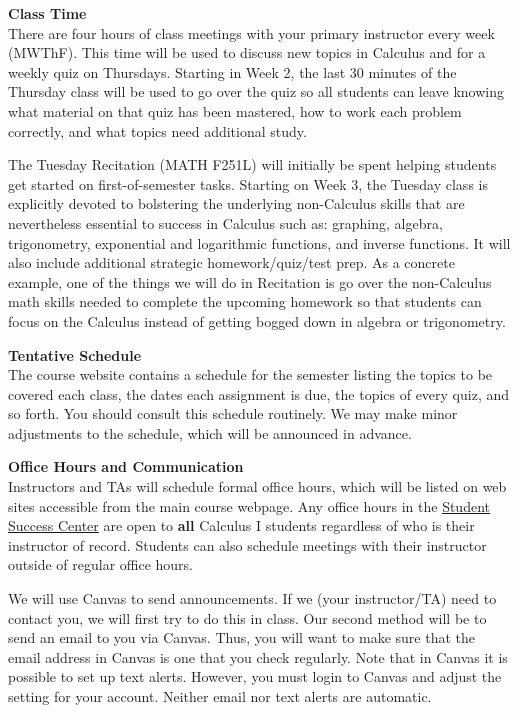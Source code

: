 \documentclass[12pt]{article}
\renewcommand{\emph}[1]{\textsf{\textbf{#1}}}
\newcommand{\localhead}[1]{\par\smallskip\textbf{#1}\nobreak\\}%
\def\heading#1{\localhead{\large\emph{#1}}}
\begin{document}
\newpage

\heading{Class Time}
There are four hours of class meetings with your primary instructor every week (MWThF). This time will be used to discuss new topics in Calculus and for a weekly quiz on Thursdays. Starting in Week 2, the last 30 minutes of the Thursday class will be used to go over the quiz so all students can leave knowing what material on that quiz has been mastered, how to work each problem correctly,  and what topics need additional study. 

The Tuesday Recitation (MATH F251L) will initially be spent helping students get started on first-of-semester tasks. Starting on Week 3, the Tuesday class is explicitly devoted to bolstering the underlying non-Calculus skills that are nevertheless essential to success in Calculus such as: graphing, algebra, trigonometry, exponential and logarithmic functions, and inverse functions. It will also include additional strategic homework/quiz/test prep. As a concrete example, one of the things we will do in Recitation is go over the non-Calculus math skills needed to complete the upcoming homework so that students can focus on the Calculus instead of getting bogged down in algebra or trigonometry.

\heading{Tentative Schedule}
The course website contains a %
schedule for the semester listing
the topics to be covered each class, the dates each assignment is due,
the topics of every quiz, and so forth. You should consult this schedule
routinely.  We may make minor adjustments to the schedule, which
will be announced in advance.

\heading{Office Hours and Communication}
Instructors and TAs will schedule formal office hours,
which will be listed on web sites accessible from the main
course webpage. Any office hours in the \href{https://uaf.edu/dms/mathlab/}{Student Success Center} are open to \emph{all} Calculus I students regardless of who is their instructor of record. Students can also schedule meetings with their instructor outside of regular office hours. 

We will use Canvas to send announcements. If we (your instructor/TA) need to contact you, we will first try to do this in class. Our second method will be to send an email to you via Canvas. Thus, you will want to make sure that the email address in Canvas is one that you check regularly. Note that in Canvas it is possible to set up text alerts. However, you must login to Canvas and adjust the setting for your account. Neither email nor text alerts are automatic.
\end{document}
